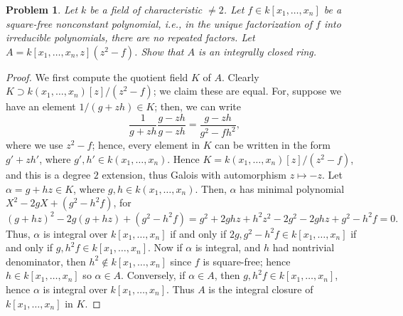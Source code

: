 \documentclass[12pt,letterpaper]{article}
\newtheorem{problem}{Problem}[section]
\theoremstyle{definition}
\theoremstyle{remark}
\numberwithin{equation}{section}
\numberwithin{figure}{problem}
\begin{document}
\begin{problem}
  Let $k$ be a field of characteristic $\ne 2$. Let $f \in k[x_1,\ldots,x_n]$ be a \emph{square-free} nonconstant polynomial, i.e., in the unique factorization of $f$ into irreducible polynomials, there are no repeated factors. Let $A = k[x_1,\ldots,x_n,z](z^2-f)$. Show that $A$ is an integrally closed ring.
\end{problem}
\begin{proof}
  We first compute the quotient field $K$ of $A$. Clearly $K \supset k(x_1,\ldots,x_n)[z]/(z^2-f)$; we claim these are equal. For, suppose we have an element $1/(g+zh) \in K$; then, we can write
  \begin{equation*}
    \frac{1}{g+zh}\frac{g-zh}{g-zh} = \frac{g-zh}{g^2-fh^2},
  \end{equation*}
  where we use $z^2 - f$; hence, every element in $K$ can be written in the form $g' + zh'$, where $g',h' \in k(x_1,\ldots,x_n)$. Hence $K = k(x_1,\ldots,x_n)[z]/(z^2-f)$, and this is a degree $2$ extension, thus Galois with automorphism $z \mapsto -z$. Let $\alpha = g + hz \in K$, where $g,h \in k(x_1,\ldots,x_n)$. Then, $\alpha$ has minimal polynomial $X^2 - 2gX + (g^2-h^2f)$, for
  \begin{equation*}
    (g+hz)^2 - 2g(g+hz) + (g^2 - h^2f) = g^2 + 2ghz + h^2z^2 - 2g^2 - 2ghz + g^2 - h^2f = 0.
  \end{equation*}
  Thus, $\alpha$ is integral over $k[x_1,\ldots,x_n]$ if and only if $2g,g^2-h^2f \in k[x_1,\ldots,x_n]$ if and only if $g, h^2f \in k[x_1,\ldots,x_n]$. Now if $\alpha$ is integral, and $h$ had nontrivial denominator, then $h^2 \notin k[x_1,\ldots,x_n]$ since $f$ is square-free; hence $h \in k[x_1,\ldots,x_n]$ so $\alpha \in A$. Conversely, if $\alpha \in A$, then $g,h^2f \in k[x_1,\ldots,x_n]$, hence $\alpha$ is integral over $k[x_1,\ldots,x_n]$. Thus $A$ is the integral closure of $k[x_1,\ldots,x_n]$ in $K$.
\end{proof}
\end{document}
